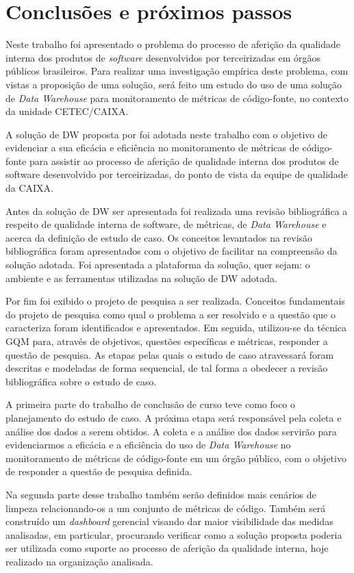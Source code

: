 \chapter{Conclusões e próximos passos}

Neste trabalho foi apresentado o problema do processo de aferição da qualidade interna dos produtos de \textit{software} desenvolvidos por terceirizadas em órgãos públicos brasileiros. Para realizar uma investigação empírica deste problema, com vistas a proposição de uma solução, será feito um estudo do uso de uma solução de \textit{Data Warehouse} para monitoramento de métricas de código-fonte, no contexto da unidade CETEC/CAIXA.

A solução de DW proposta por  foi adotada neste trabalho com o objetivo de evidenciar a sua eficácia e eficiência no monitoramento de métricas de código-fonte para assistir ao processo de aferição de qualidade interna dos produtos de software desenvolvido por terceirizadas, do ponto de vista da equipe de qualidade da CAIXA. 

Antes da solução de DW ser apresentada foi realizada uma revisão bibliográfica a respeito de qualidade interna de software, de métricas, de \textit{Data Warehouse} e acerca da definição de estudo de caso. Os conceitos levantados na revisão bibliográfica foram apresentados com o objetivo de facilitar na compreensão da solução adotada. Foi apresentada a plataforma da solução, quer sejam: o ambiente e as ferramentas utilizadas na solução de DW adotada. 

Por fim foi  exibido o projeto de pesquisa a ser realizada. Conceitos fundamentais do projeto de pesquisa como qual o problema a ser resolvido e a questão que o caracteriza foram identificados e apresentados. Em seguida, utilizou-se da  técnica GQM para, através de objetivos, questões específicas e métricas, responder a questão de pesquisa. As etapas pelas quais o estudo de caso atravessará foram descritas e modeladas de forma sequencial, de tal forma a obedecer a revisão bibliográfica sobre o estudo de caso.

A primeira parte do trabalho de conclusão de curso teve como foco o planejamento do estudo de caso. A próxima etapa será responsável pela coleta e análise dos dados a serem obtidos. A coleta e a análise dos dados servirão para evidenciarmos a eficácia e a eficiência do uso de \textit{Data Warehouse} no monitoramento de métricas de código-fonte em um órgão público, com o objetivo de responder a questão de pesquisa definida.

Na segunda parte desse trabalho também serão definidos mais cenários de limpeza relacionando-os a um conjunto de métricas de código. Também será construído um \textit{dashboard} gerencial visando dar maior visibilidade das medidas analisadas, em particular, procurando verificar como a solução proposta poderia ser utilizada como suporte ao processo de aferição da qualidade interna, hoje realizado na organização analisada.